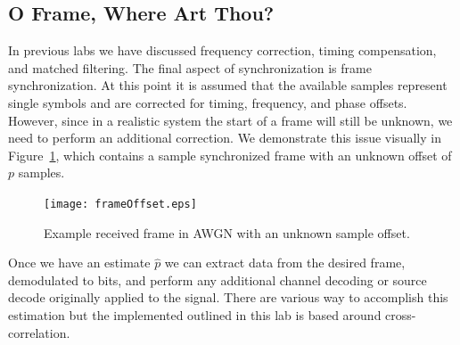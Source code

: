 \documentclass[letterpaper,12pt]{article}
\begin{document}
\subsection{O Frame, Where Art Thou?}\label{sec:models}
%
In previous labs we have discussed frequency correction, timing compensation, and matched filtering.  The 
final aspect of synchronization is frame synchronization.  At this point it is assumed that the available 
samples represent single symbols and are corrected for timing, frequency, and phase offsets. However, since 
in a realistic system the start of a frame will still be unknown, we  need to perform an additional 
correction. We demonstrate this issue visually in Figure~\ref{fig:frame_offset2}, which contains a sample 
synchronized frame with an unknown offset of $p$ samples.
%
\begin{figure}[ht!]\label{fig:frame_offset2}
 \centering
 \texttt{[image: frameOffset.eps]}
\caption{Example received frame in AWGN with an unknown sample offset.}
\end{figure} 
%
Once we have an estimate $\hat{p}$ we can extract data from the desired frame, demodulated to bits, and 
perform any additional channel decoding or source decode originally applied to the signal.  There are various way to accomplish this estimation but the implemented outlined in this lab is based around cross-correlation.\par

\end{document}
